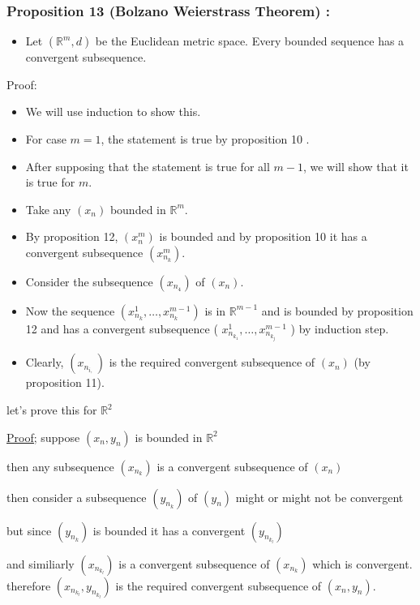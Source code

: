 \documentclass[12pt,a4paper]{article}
\begin{document}
 \subsubsection{Proposition 13 (Bolzano Weierstrass Theorem) :} 
\begin{itemize}
    \item Let \(\left(\mathbb{R}^m, d\right)\) be the Euclidean metric space. Every bounded sequence has a convergent subsequence.
\end{itemize}
Proof:
\begin{itemize}
    \item We will use induction to show this.
    \item For case \(m=1\), the statement is true by proposition 10 .
    \item After supposing that the statement is true for all \(m-1\), we will show that it is true for \(m\).
    \item Take any \(\left(x_n\right)\) bounded in \(\mathbb{R}^m\).
    \item By proposition 12, \(\left(x_n^m\right)\) is bounded and by proposition 10 it has a convergent subsequence \(\left(x_{n_k}^m\right)\).
    \item Consider the subsequence \(\left(x_{n_4}\right)\) of \(\left(x_n\right)\).
    \item Now the sequence \(\left(x_{n_k}^1, \ldots, x_{n_k}^{m-1}\right)\) is in \(\mathbb{R}^{m-1}\) and is bounded by proposition 12 and has a convergent subsequence ( \(x_{n_{k_1}}^1, \ldots, x_{n_{k_j}}^{m-1}\) ) by induction step.
    \item Clearly, \(\left(x_{n_{i, ~}}\right)\) is the required convergent subsequence of \(\left(x_n\right)\) (by proposition 11).
\end{itemize}

let's prove this for \(\mathbb{R}^2\)

\underline{Proof;}
suppose \((x_{n},y_{n})\) is bounded in \(\mathbb{R}^2\) 

then any subsequence \((x_{n_{k}})\) is a convergent subsequence of \((x_{n})\)

then consider a subsequence \((y_{n_{k}})\) of \((y_{n})\) might or might not be convergent 

but since \((y_{n_{k}})\) is bounded it has a convergent \((y_{n_{k_{l}}})\)  

and similiarly \((x_{n_{k_{l}}})\) is a convergent subsequence of \((x_{n_{k}})\) which is convergent. therefore \((x_{n_{k_{l}}},y_{n_{k_{l}}})\) is the required convergent subsequence of \((x_{n},y_{n})\).  
 
\end{document}
